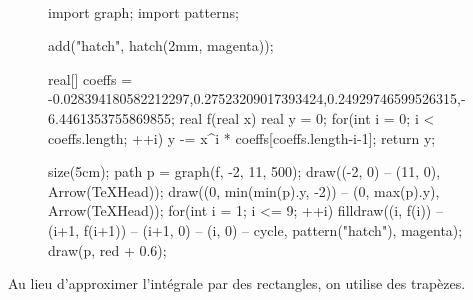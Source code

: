 \begin{rmk}~\\
	\begin{figure}[H]
		\centering
		\begin{asy}
			import graph;
			import patterns;

			add("hatch", hatch(2mm, magenta));

			real[] coeffs = {-0.028394180582212297,0.27523209017393424,0.24929746599526315,-6.4461353755869855};
			real f(real x) {
				real y = 0;
				for(int i = 0; i < coeffs.length; ++i) {
					y -= x^i * coeffs[coeffs.length-i-1];
				}
				return y;
			}

			size(5cm);
			path p = graph(f, -2, 11, 500);
			draw((-2, 0) -- (11, 0), Arrow(TeXHead));
			draw((0, min(min(p).y, -2)) -- (0, max(p).y), Arrow(TeXHead));
			for(int i = 1; i <= 9; ++i) {
				filldraw((i, f(i)) -- (i+1, f(i+1)) -- (i+1, 0) -- (i, 0) -- cycle, pattern("hatch"), magenta);
			}
			draw(p, red + 0.6);
		\end{asy}
	\end{figure}
	Au lieu d'approximer l'intégrale par des rectangles, on utilise des trapèzes.
\end{rmk}

